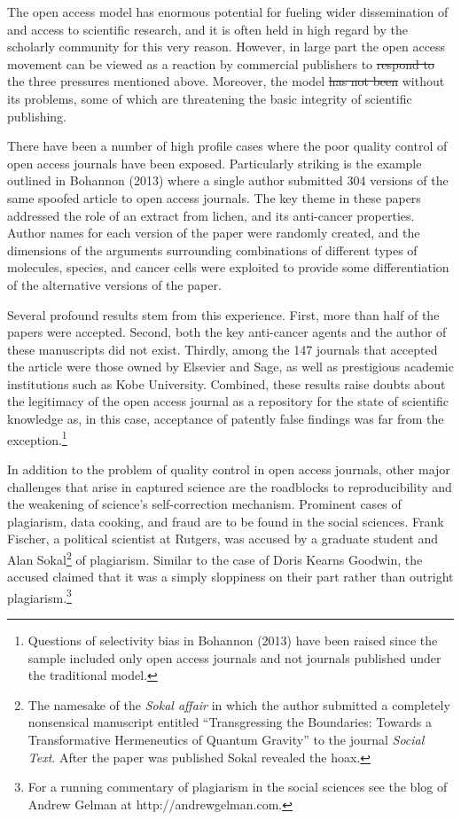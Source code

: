 \documentclass{article}
\providecommand{\DIFadd}[1]{{\protect\color{blue}\uwave{#1}}} %
\providecommand{\DIFdel}[1]{{\protect\color{red}\sout{#1}}}                      %
\providecommand{\DIFaddbegin}{} %
\providecommand{\DIFaddend}{} %
\providecommand{\DIFdelbegin}{} %
\providecommand{\DIFdelend}{} %
\begin{document}
The open access model has enormous potential for fueling wider
dissemination of and access to scientific research, and it is often held
in high regard by the scholarly community for this very reason. However,
in large part the open access movement can be viewed as a reaction by
commercial publishers to \DIFdelbegin \DIFdel{respond to }\DIFdelend the three pressures mentioned above. Moreover,
the model \DIFdelbegin \DIFdel{has not been }\DIFdelend \DIFaddbegin \DIFadd{is not }\DIFaddend without its problems, some of which are threatening the
basic integrity of scientific publishing.

There have been a number of high profile cases where the poor quality
control of open access journals have been exposed. Particularly striking
is the example outlined in Bohannon (2013) where a single author
submitted 304 versions of the same spoofed article to open access
journals. The key theme in these papers addressed the role of an extract
from lichen, and its anti-cancer properties. Author names for each
version of the paper were randomly created, and the dimensions of the
arguments surrounding combinations of different types of molecules,
species, and cancer cells were exploited to provide some differentiation
of the alternative versions of the paper.

Several profound results stem from this experience. First, more than
half of the papers were accepted. Second, both the key anti-cancer
agents and the author of these manuscripts did not exist. Thirdly, among
the 147 journals that accepted the article were those owned by Elsevier
and Sage, as well as prestigious academic institutions such as Kobe
University. Combined, these results raise doubts about the legitimacy of
the open access journal as a repository for the state of scientific
knowledge as, in this case, acceptance of patently false findings was
far from the exception.\footnote{Questions of selectivity bias in
  Bohannon (2013) have been raised since the sample included only open
  access journals and not journals published under the traditional
  model.}

In addition to the problem of quality control in open access journals,
other major challenges that arise in captured science are the roadblocks
to reproducibility and the weakening of science's self-correction
mechanism. Prominent cases of plagiarism, data cooking, and fraud are to
be found in the social sciences. Frank Fischer, a political scientist at
Rutgers, was accused by a graduate student and Alan Sokal\footnote{The
  namesake of the \emph{Sokal affair} in which the author submitted a
  completely nonsensical manuscript entitled ``Transgressing the
  Boundaries: Towards a Transformative Hermeneutics of Quantum Gravity''
  to the journal \emph{Social Text}. After the paper was published Sokal
  revealed the hoax.} of plagiarism. Similar to the case of Doris Kearns
Goodwin, the accused claimed that it was a simply sloppiness on their
part rather than outright plagiarism.\footnote{For a running commentary
  of plagiarism in the social sciences see the blog of Andrew Gelman at
  http://andrewgelman.com.}
\end{document}
